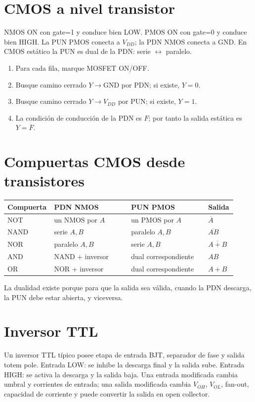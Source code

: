 \documentclass[11pt,letterpaper]{article}
\newcommand{\NOT}[1]{\overline{#1}}\newcommand{\VDD}{V_{DD}}\newcommand{\VCC}{V_{CC}}\newcommand{\VOH}{V_{OH}}\newcommand{\VOL}{V_{OL}}\newcommand{\VIH}{V_{IH}}\newcommand{\VIL}{V_{IL}}
\begin{document}
\section{CMOS a nivel transistor}
\begin{resumen}
NMOS ON con gate=1 y conduce bien LOW. PMOS ON con gate=0 y conduce bien HIGH. La PUN PMOS conecta a $\VDD$; la PDN NMOS conecta a GND. En CMOS estático la PUN es dual de la PDN: serie $\leftrightarrow$ paralelo.
\end{resumen}
\begin{procedimiento}\begin{enumerate}
\item Para cada fila, marque MOSFET ON/OFF.
\item Busque camino cerrado $Y\to$GND por PDN; si existe, $Y=0$.
\item Busque camino cerrado $Y\to\VDD$ por PUN; si existe, $Y=1$.
\item La condición de conducción de la PDN es $F$; por tanto la salida estática es $Y=\NOT{F}$.
\end{enumerate}\end{procedimiento}

\section{Compuertas CMOS desde transistores}
\begin{center}\begin{tabular}{p{0.15\linewidth}p{0.33\linewidth}p{0.33\linewidth}p{0.11\linewidth}}\toprule
Compuerta&PDN NMOS&PUN PMOS&Salida\\\midrule
NOT&un NMOS por $A$&un PMOS por $A$&$\NOT{A}$\\
NAND&serie $A,B$&paralelo $A,B$&$\NOT{AB}$\\
NOR&paralelo $A,B$&serie $A,B$&$\NOT{A+B}$\\
AND&NAND + inversor&dual correspondiente&$AB$\\
OR&NOR + inversor&dual correspondiente&$A+B$\\\bottomrule
\end{tabular}\end{center}
La dualidad existe porque para que la salida sea válida, cuando la PDN descarga, la PUN debe estar abierta, y viceversa.

\section{Inversor TTL}
Un inversor TTL típico posee etapa de entrada BJT, separador de fase y salida totem pole. Entrada LOW: se inhibe la descarga final y la salida sube. Entrada HIGH: se activa la descarga y la salida baja. Una entrada modificada cambia umbral y corrientes de entrada; una salida modificada cambia $\VOH$, $\VOL$, fan-out, capacidad de corriente y puede convertir la salida en open collector.
\end{document}

